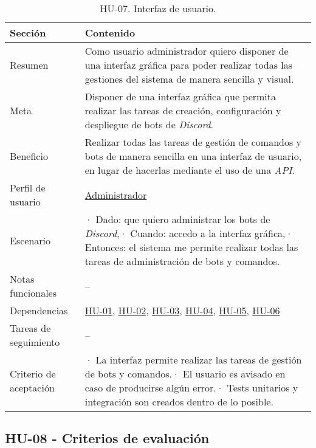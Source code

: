 \begin{table}[H]
    \centering
    \def\arraystretch{1.25}
    \begin{adjustbox}{max width=\textwidth}
    \begin{tabularx}{\textwidth}{|l|L|}
    \hline
        \textbf{Sección} & \textbf{Contenido} \\ \hline
    \hline
        Resumen & Como usuario administrador quiero disponer de una interfaz gráfica para poder realizar todas las gestiones del sistema de manera sencilla y visual. \\ \hline
        Meta & Disponer de una interfaz gráfica que permita realizar las tareas de creación, configuración y despliegue de bots de \textit{Discord}. \\ \hline
        Beneficio & Realizar todas las tareas de gestión de comandos y bots de manera sencilla en una interfaz de usuario, en lugar de hacerlas mediante el uso de una \textit{API}. \\ \hline
        Perfil de usuario & \hyperref[sec:personaAdmin]{Administrador} \\ \hline
        Escenario & · Dado: que quiero administrar los bots de \textit{Discord},\linebreak · Cuando: accedo a la interfaz gráfica,\linebreak · Entonces: el sistema me permite realizar todas las tareas de administración de bots y comandos. \\ \hline
        Notas funcionales & – \\ \hline
        Dependencias & \hyperref[sec:hu01]{HU-01}, \hyperref[sec:hu02]{HU-02}, \hyperref[sec:hu03]{HU-03}, \hyperref[sec:hu04]{HU-04}, \hyperref[sec:hu05]{HU-05}, \hyperref[sec:hu06]{HU-06} \\ \hline
        Tareas de seguimiento & – \\ \hline
        Criterio de aceptación & · La interfaz permite realizar las tareas de gestión de bots y comandos.\linebreak · El usuario es avisado en caso de producirse algún error.\linebreak · Tests unitarios y integración son creados dentro de lo posible. \\ \hline
    \end{tabularx}
    \end{adjustbox}
    \caption{HU-07. Interfaz de usuario.}
\end{table}

\subsection{HU-08 - Criterios de evaluación}
\label{sec:hu08}

